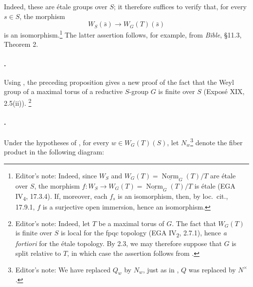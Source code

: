 Indeed, these are étale groups over \(S\); it therefore suffices to
verify that, for every \(s\in S\), the morphism
\[
  W_S(\bar s)\longrightarrow W_G(T)(\bar s)
\]
is an isomorphism.\footnote{Editor's note: Indeed, since \(W_S\) and
\(W_G(T)=\underline{\operatorname{Norm}}_G(T)/T\) are étale over
\(S\), the morphism
\(f:W_S\to W_G(T)=\underline{\operatorname{Norm}}_G(T)/T\) is étale
\textup{(EGA IV\textsubscript{4}, 17.3.4)}. If, moreover, each
\(f_s\) is an isomorphism, then, by \textup{loc.\ cit.}, 17.9.1,
\(f\) is a surjective open immersion, hence an isomorphism.}
The latter assertion follows, for example, from \emph{Bible},
\S11.3, Theorem 2.

\paragraph{.}
Using , the preceding proposition gives a new proof of the fact
that the Weyl group of a maximal torus of a reductive \(S\)-group
\(G\) is finite over \(S\) \textup{(Exposé XIX, 2.5(ii))}.
\footnote{Editor's note: Indeed, let \(T\) be a maximal torus of
\(G\). The fact that \(W_G(T)\) is finite over \(S\) is local for
the fpqc topology \textup{(EGA IV\textsubscript{2}, 2.7.1)}, hence
\emph{a fortiori} for the étale topology. By 2.3, we may therefore
suppose that \(G\) is split relative to \(T\), in which case the
assertion follows from .}

\paragraph{.}
Under the hypotheses of , for every \(w\in W_G(T)(S)\), let
\(N_w\)\footnote{Editor's note: We have replaced \(Q_w\) by \(N_w\),
just as in , \(Q\) was replaced by \(N^\times\).}
denote the fiber product in the following diagram:

\begin{center}


\end{center}

